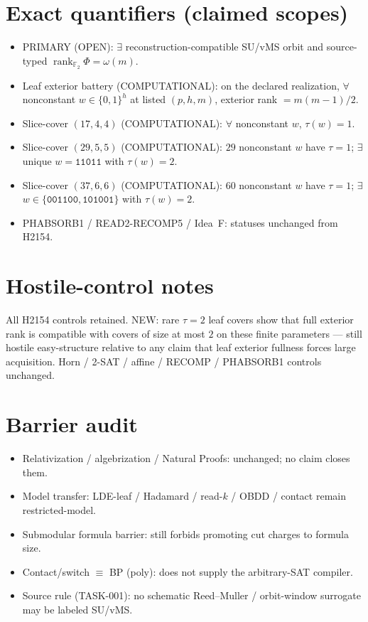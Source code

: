 \documentclass[11pt]{article}
\begin{document}
\section*{Exact quantifiers (claimed scopes)}
\begin{itemize}
\item PRIMARY (OPEN): $\exists$ reconstruction-compatible SU/vMS orbit and source-typed
  $\operatorname{rank}_{\mathbb F_2}\Phi=\omega(m)$.
\item Leaf exterior battery (COMPUTATIONAL): on the declared realization, $\forall$ nonconstant
  $w\in\{0,1\}^h$ at listed $(p,h,m)$, exterior rank $=m(m-1)/2$.
\item Slice-cover $(17,4,4)$ (COMPUTATIONAL): $\forall$ nonconstant $w$, $\tau(w)=1$.
\item Slice-cover $(29,5,5)$ (COMPUTATIONAL): $29$ nonconstant $w$ have $\tau{=}1$;
  $\exists$ unique $w=\mathtt{11011}$ with $\tau(w)=2$.
\item Slice-cover $(37,6,6)$ (COMPUTATIONAL): $60$ nonconstant $w$ have $\tau{=}1$;
  $\exists$ $w\in\{\mathtt{001100},\mathtt{101001}\}$ with $\tau(w)=2$.
\item PHABSORB1 / READ2-RECOMP5 / Idea~F: statuses unchanged from H2154.
\end{itemize}

\section*{Hostile-control notes}
All H2154 controls retained. NEW: rare $\tau{=}2$ leaf covers show that full exterior rank
is compatible with covers of size at most $2$ on these finite parameters --- still hostile
easy-structure relative to any claim that leaf exterior fullness forces large acquisition.
Horn / 2-SAT / affine / RECOMP / PHABSORB1 controls unchanged.

\section*{Barrier audit}
\begin{itemize}
\item Relativization / algebrization / Natural Proofs: unchanged; no claim closes them.
\item Model transfer: LDE-leaf / Hadamard / read-$k$ / OBDD / contact remain restricted-model.
\item Submodular formula barrier: still forbids promoting cut charges to formula size.
\item Contact/switch $\equiv$ BP (poly): does not supply the arbitrary-SAT compiler.
\item Source rule (TASK-001): no schematic Reed--Muller / orbit-window surrogate may be labeled SU/vMS.
\end{itemize}
\end{document}
